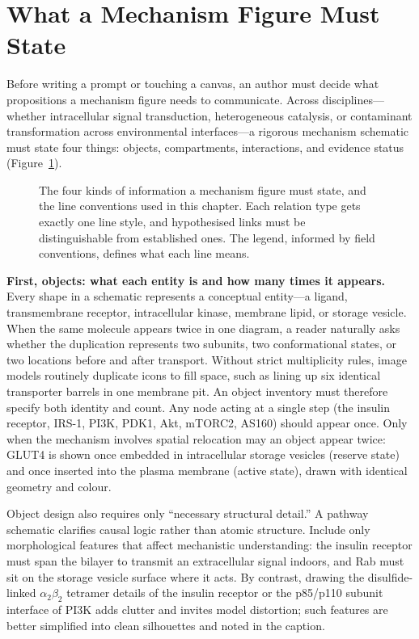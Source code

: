 \section{What a Mechanism Figure Must State}

Before writing a prompt or touching a canvas, an author must decide what propositions a mechanism figure needs to communicate. Across disciplines---whether intracellular signal transduction, heterogeneous catalysis, or contaminant transformation across environmental interfaces---a rigorous mechanism schematic must state four things: objects, compartments, interactions, and evidence status (Figure~\ref{fig:ch07-01}).

\begin{figure}[htbp]\centering

\caption{The four kinds of information a mechanism figure must state, and the line conventions used in this chapter. Each relation type gets exactly one line style, and hypothesised links must be distinguishable from established ones. The legend, informed by field conventions, defines what each line means.}\label{fig:ch07-01}
\end{figure}

\textbf{First, objects: what each entity is and how many times it appears.} Every shape in a schematic represents a conceptual entity---a ligand, transmembrane receptor, intracellular kinase, membrane lipid, or storage vesicle. When the same molecule appears twice in one diagram, a reader naturally asks whether the duplication represents two subunits, two conformational states, or two locations before and after transport. Without strict multiplicity rules, image models routinely duplicate icons to fill space, such as lining up six identical transporter barrels in one membrane pit. An object inventory must therefore specify both identity and count. Any node acting at a single step (the insulin receptor, IRS-1, PI3K, PDK1, Akt, mTORC2, AS160) should appear once. Only when the mechanism involves spatial relocation may an object appear twice: GLUT4 is shown once embedded in intracellular storage vesicles (reserve state) and once inserted into the plasma membrane (active state), drawn with identical geometry and colour.

Object design also requires only ``necessary structural detail.'' A pathway schematic clarifies causal logic rather than atomic structure. Include only morphological features that affect mechanistic understanding: the insulin receptor must span the bilayer to transmit an extracellular signal indoors, and Rab must sit on the storage vesicle surface where it acts. By contrast, drawing the disulfide-linked $\alpha_2\beta_2$ tetramer details of the insulin receptor or the p85/p110 subunit interface of PI3K adds clutter and invites model distortion; such features are better simplified into clean silhouettes and noted in the caption.

